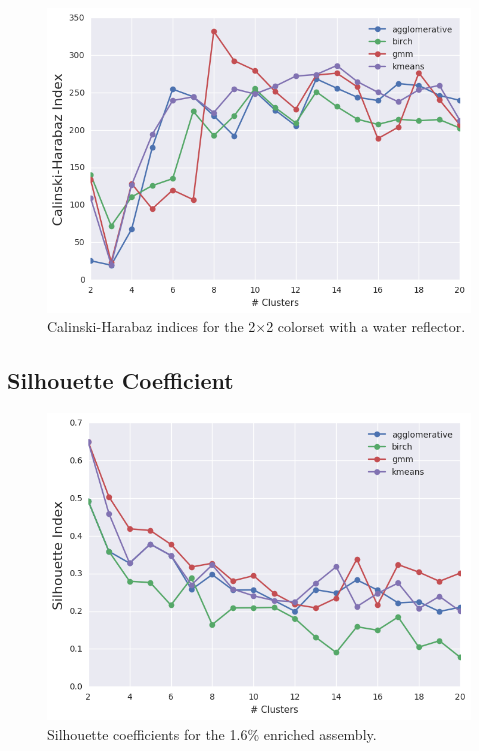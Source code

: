 \begin{figure}[h!]
\centering
\includegraphics[width=0.87\linewidth]{figures/results/model-select/reflector/ch-combined-U238-nu-fission-1}
\vspace{2mm}
\caption[Calinski-Harabaz indices for the 2$\times$2 colorset with reflector]{Calinski-Harabaz indices for the 2$\times$2 colorset with a water reflector.}
\label{fig:chap11-refl-ch-index}
\end{figure}

\clearpage

\subsection{Silhouette Coefficient}
\label{subsec:chap11-silhouette-coeff}

\begin{figure}[h!]
\centering
\includegraphics[width=0.87\linewidth]{figures/results/model-select/assm-16/silhouette-combined-U238-capture-1}
\vspace{2mm}
\caption[Silhouette coefficients for the 1.6\% enriched assembly]{Silhouette coefficients for the 1.6\% enriched assembly.}
\label{fig:chap11-assm-16-silhouette-coeff}
\end{figure}

